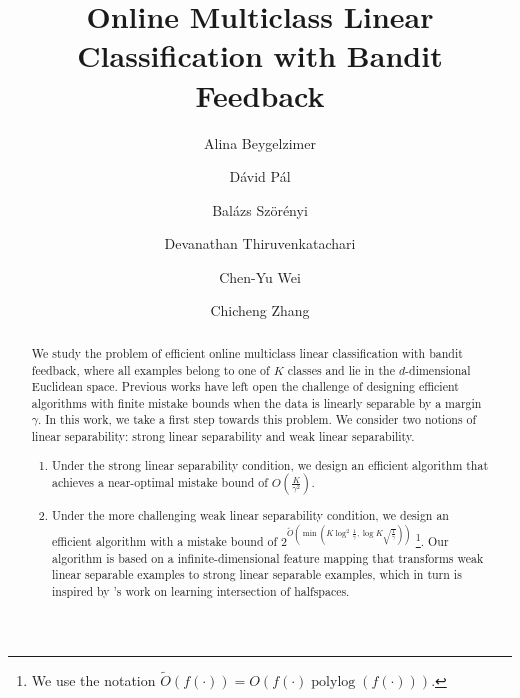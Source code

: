 \documentclass[12pt]{article}
\title{Online Multiclass Linear Classification with Bandit Feedback}
\author{
Alina Beygelzimer \and
D\'avid P\'al \and
Bal\'azs Sz\"or\'enyi \and
Devanathan Thiruvenkatachari \and
Chen-Yu Wei \and
Chicheng Zhang
}
\DeclareMathOperator*{\polylog}{polylog}
\begin{document}
\maketitle

\begin{abstract}
We study the problem of efficient online multiclass linear classification with
bandit feedback, where all examples belong to one of $K$ classes and lie in the
$d$-dimensional Euclidean space. Previous works have left open the challenge of
designing efficient algorithms with finite mistake bounds when the data is
linearly separable by a margin $\gamma$. In this work, we take a first step
towards this problem. We consider two notions of linear separability: strong
linear separability and weak linear separability.

\begin{enumerate}
\item Under the strong linear separability condition, we design an efficient
algorithm that achieves a near-optimal mistake bound of
$O\left(\frac{K}{\gamma^2} \right)$.

\item Under the more challenging weak linear separability condition, we design
an efficient algorithm with a mistake bound of $2^{\widetilde{O}(\min(K \log^2
\frac{1}{\gamma}, \log K \sqrt{\frac 1 \gamma}))}$ \footnote{We use the notation
$\widetilde{O}(f(\cdot)) = O(f(\cdot) \polylog(f(\cdot)))$.}. Our algorithm is
based on a infinite-dimensional feature mapping that transforms weak linear
separable examples to strong linear separable examples, which in turn is
inspired by \cite{Klivans-Servedio-2008}'s work on learning intersection of
halfspaces.
\end{enumerate}
\end{abstract}














\appendix


\end{document}
